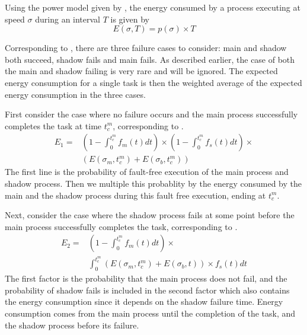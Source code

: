Using the power model given by , the
energy consumed by a process executing at speed $\sigma$ during an
interval $T$ is given by
\begin{equation}
E(\sigma,T) = p(\sigma) \times T
\end{equation}


Corresponding to , there are three
failure cases to consider: main and shadow both succeed, shadow fails
and main fails. As described earlier, the case of both the main and
shadow failing is very rare and will be ignored. The expected
energy consumption for a single task is then the weighted average of
the expected energy consumption in the three cases.


First consider the case where no failure occurs and the main process
successfully completes the task at time $t_c^m$, corresponding to
.
\begin{equation}
\begin{split}
E_1 = &  ( 1-\int_0^{t_c^m}f_m(t)dt) \times (1 - \int_0^{t_c^m} f_s(t)dt) \times \\
      &  (  E(\sigma_m,t_c^m) + E(\sigma_b,t_c^m))
\label{eq:energy_no_failure}
\end{split}
\end{equation}
The first line is the probability of fault-free execution of the main
process and shadow process. Then we multiple this probablity by the
energy consumed by the main and the shadow process during this fault
free execution, ending at $t_c^m$.

Next, consider the case where the shadow process fails at some point
before the main process successfully completes the task, corresponding to
.
\begin{equation}
\begin{split}
E_2 = & (1-\int_0^{t_c^m}f_m(t)dt) \times \\
      & \int_0^{t_c^m}(E(\sigma_m,t_c^m)+E(\sigma_b,t)) \times f_s(t)dt
\label{eq:energy_shadow_fail}
\end{split}
\end{equation}
The first factor is the probability that the main process does not
fail, and the probability of shadow fails is included in the second factor which also contains the energy consumption since it depends on the shadow failure time. Energy consumption comes from the main process until the completion of the task,
and the shadow process before its failure.

